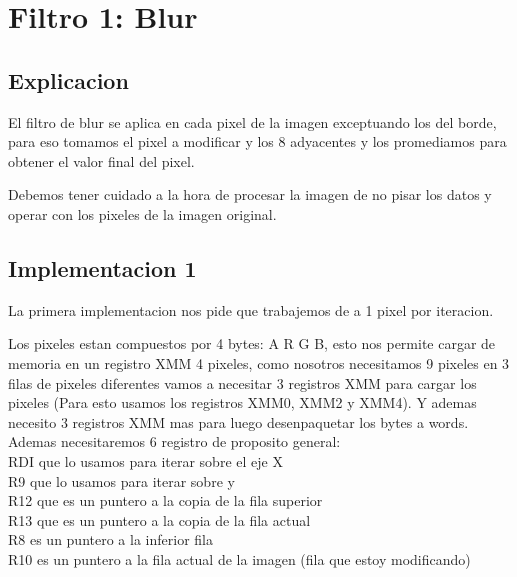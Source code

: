 \section{Filtro 1: Blur}

\subsection{Explicacion}
El filtro de blur se aplica en cada pixel de la imagen exceptuando los del borde, para eso tomamos el pixel a modificar y los 8 adyacentes y los promediamos para obtener el valor final del pixel.

Debemos tener cuidado a la hora de procesar la imagen de no pisar los datos y operar con los pixeles de la imagen original.

\subsection{Implementacion 1}
La primera implementacion nos pide que trabajemos de a 1 pixel por iteracion.

Los pixeles estan compuestos por 4 bytes: A R G B, esto nos permite cargar de memoria en un registro XMM 4 pixeles, como nosotros necesitamos 9 pixeles en 3 filas de pixeles diferentes vamos a necesitar 3 registros XMM para cargar los pixeles (Para esto usamos los registros XMM0, XMM2 y XMM4). Y ademas necesito 3 registros XMM mas para luego desenpaquetar los bytes a words. \\

Ademas necesitaremos 6 registro de proposito general: \\
RDI que lo usamos para iterar sobre el eje X \\
R9 que lo usamos para iterar sobre y \\
R12 que es un puntero a la copia de la fila superior \\
R13 que es un puntero a la copia de la fila actual \\
R8 es un puntero a la inferior fila \\
R10 es un puntero a la fila actual de la imagen (fila que estoy modificando) \\

